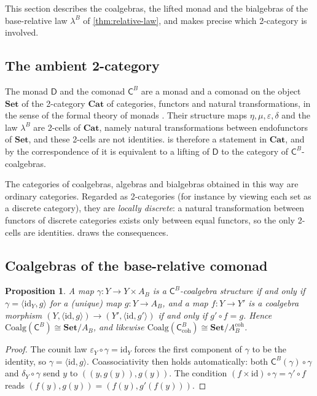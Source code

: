 \documentclass[11pt]{article}
\newtheorem{proposition}[theorem]{Proposition}
\theoremstyle{definition}
\theoremstyle{remark}
\newcommand{\D}{\mathsf{D}}
\newcommand{\Set}{\mathbf{Set}}
\newcommand{\C}{\mathsf{C}}
\newcommand{\id}{\mathrm{id}}
\begin{document}
This section describes the coalgebras, the lifted monad and the bialgebras of the base-relative law
$\lambda^B$ of \cref{thm:relative-law}, and makes precise which 2-category is involved.

\subsection{The ambient 2-category}\label{sec:ambient}

The monad $\D$ and the comonad $\C^B$ are a monad and a comonad on the object $\Set$ of the
2-category $\mathbf{Cat}$ of categories, functors and natural transformations, in the sense of the
formal theory of monads \cite{Street1972}. Their structure maps $\eta,\mu,\varepsilon,\delta$ and the
law $\lambda^B$ are 2-cells of $\mathbf{Cat}$, namely natural transformations between endofunctors of
$\Set$, and these 2-cells are not identities.  is therefore a statement in
$\mathbf{Cat}$, and by the correspondence of \cite{PowerWatanabe2002} it is equivalent to a lifting of
$\D$ to the category of $\C^B$-coalgebras.

The categories of coalgebras, algebras and bialgebras obtained in this way are ordinary categories.
Regarded as 2-categories (for instance by viewing each set as a discrete category), they are
\emph{locally discrete}: a natural transformation between functors of discrete categories exists only
between equal functors, so the only 2-cells are identities.  draws the consequences.

\subsection{Coalgebras of the base-relative comonad}

\begin{proposition}\label{prop:coalg}
A map $\gamma\colon Y\to Y\times A_B$ is a $\C^B$-coalgebra structure if and only if
$\gamma=\langle\id_Y,g\rangle$ for a (unique) map $g\colon Y\to A_B$, and a map $f\colon Y\to Y'$ is a
coalgebra morphism $(Y,\langle\id,g\rangle)\to(Y',\langle\id,g'\rangle)$ if and only if $g'\circ f=g$.
Hence $\mathrm{Coalg}(\C^B)\cong\Set/A_B$, and likewise $\mathrm{Coalg}(\C^B_{\mathrm{coh}})\cong
\Set/A^{\mathrm{coh}}_B$.
\end{proposition}
\begin{proof}
The counit law $\varepsilon_Y\circ\gamma=\id_Y$ forces the first component of $\gamma$ to be the
identity, so $\gamma=\langle\id,g\rangle$. Coassociativity then holds automatically: both
$\C^B(\gamma)\circ\gamma$ and $\delta_Y\circ\gamma$ send $y$ to $((y,g(y)),g(y))$. The condition
$(f\times\id)\circ\gamma=\gamma'\circ f$ reads $(f(y),g(y))=(f(y),g'(f(y)))$.
\end{proof}
\end{document}
